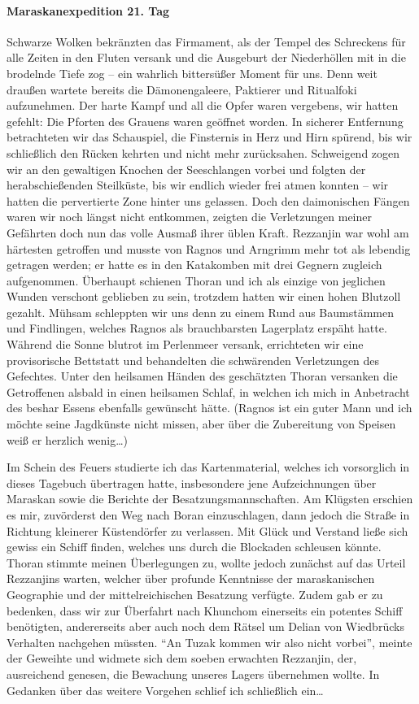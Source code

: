 \paragraph{Maraskanexpedition 21. Tag}
Schwarze Wolken bekränzten das Firmament, als der Tempel des Schreckens für alle Zeiten in den Fluten versank und die Ausgeburt der Niederhöllen mit in die brodelnde Tiefe zog -- ein wahrlich bittersüßer Moment für uns. Denn weit draußen wartete bereits die Dämonengaleere, Paktierer und Ritualfoki aufzunehmen. Der harte Kampf und all die Opfer waren vergebens, wir hatten gefehlt: Die Pforten des Grauens waren geöffnet worden. In sicherer Entfernung betrachteten wir das Schauspiel, die Finsternis in Herz und Hirn spürend, bis wir schließlich den Rücken kehrten und nicht mehr zurücksahen. Schweigend zogen wir an den gewaltigen Knochen der Seeschlangen vorbei und folgten der herabschießenden Steilküste, bis wir endlich wieder frei atmen konnten -- wir hatten die pervertierte Zone hinter uns gelassen. Doch den daimonischen Fängen waren wir noch längst nicht entkommen, zeigten die Verletzungen meiner Gefährten doch nun das volle Ausmaß ihrer üblen Kraft. Rezzanjin war wohl am härtesten getroffen und musste von Ragnos und Arngrimm mehr tot als lebendig getragen werden; er hatte es in den Katakomben mit drei Gegnern zugleich aufgenommen. Überhaupt schienen Thoran und ich als einzige von jeglichen Wunden verschont geblieben zu sein, trotzdem hatten wir einen hohen Blutzoll gezahlt. Mühsam schleppten wir uns denn zu einem Rund aus Baumstämmen und Findlingen, welches Ragnos als brauchbarsten Lagerplatz erspäht hatte. Während die Sonne blutrot im Perlenmeer versank, errichteten wir eine provisorische Bettstatt und behandelten die schwärenden Verletzungen des Gefechtes. Unter den heilsamen Händen des geschätzten Thoran versanken die Getroffenen alsbald in einen heilsamen Schlaf, in welchen ich mich in Anbetracht des beshar Essens ebenfalls gewünscht hätte. (Ragnos ist ein guter Mann und ich möchte seine Jagdkünste nicht missen, aber über die Zubereitung von Speisen weiß er herzlich wenig\dots)

Im Schein des Feuers studierte ich das Kartenmaterial, welches ich vorsorglich in dieses Tagebuch übertragen hatte, insbesondere jene Aufzeichnungen über Maraskan sowie die Berichte der Besatzungsmannschaften. Am Klügsten erschien es mir, zuvörderst den Weg nach Boran einzuschlagen, dann jedoch die Straße in Richtung kleinerer Küstendörfer zu verlassen. Mit Glück und Verstand ließe sich gewiss ein Schiff finden, welches uns durch die Blockaden schleusen könnte. Thoran stimmte meinen Überlegungen zu, wollte jedoch zunächst auf das Urteil Rezzanjins warten, welcher über profunde Kenntnisse der maraskanischen Geographie und der mittelreichischen Besatzung verfügte. Zudem gab er zu bedenken, dass wir zur Überfahrt nach Khunchom einerseits ein potentes Schiff benötigten, andererseits aber auch noch dem Rätsel um Delian von Wiedbrücks Verhalten nachgehen müssten. ``An Tuzak kommen wir also nicht vorbei'', meinte der Geweihte und widmete sich dem soeben erwachten Rezzanjin, der, ausreichend genesen, die Bewachung unseres Lagers übernehmen wollte. In Gedanken über das weitere Vorgehen schlief ich schließlich ein\dots

